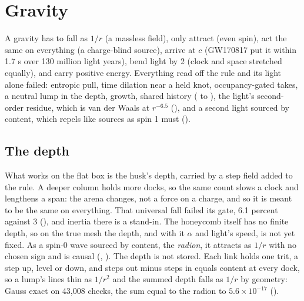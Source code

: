 \section{Gravity}
\label{sec:gravity}

A gravity has to fall as $1/r$ (a massless field), only attract (even spin), act the same on everything (a
charge-blind source), arrive at $c$ (GW170817 put it within 1.7 s over 130 million light years), bend light by 2
(clock and space stretched equally), and carry positive energy. Everything read off the rule and its light alone
failed: entropic pull, time dilation near a held knot, occupancy-gated takes, a neutral lump in the depth, growth,
shared history ( to ), the light's second-order residue, which is van der Waals at
$r^{-6.5}$ (), and a second light sourced by content, which repels like sources as spin 1 must
().

\subsection{The depth}

What works on the flat box is the husk's depth, carried by a step field added to the rule. A deeper column holds
more docks, so the same count slows a clock and lengthens a span: the arena changes, not a force on a charge, and so
it is meant to be the same on everything. That universal fall failed its gate, 6.1 percent against 3
(), and inertia there is a stand-in. The honeycomb itself has no finite depth, so on the true mesh
the depth, and with it $\alpha$ and light's speed, is not yet fixed. As a spin-0 wave sourced by
content, the \emph{radion}, it attracts as $1/r$ with no chosen sign and is causal (,
). The depth is not stored. Each link holds one trit, a step up, level or down, and steps out minus
steps in equals content at every dock, so a lump's lines thin as $1/r^2$ and the summed depth falls as $1/r$ by
geometry: Gauss exact on 43,008 checks, the sum equal to the radion to $5.6 \times 10^{-17}$ ().

